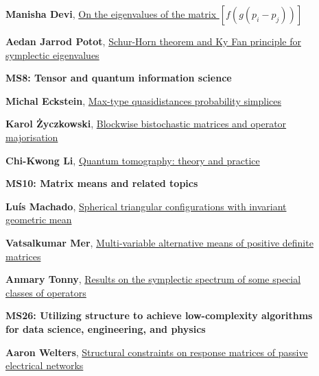 \documentclass[ILAS2025-program.tex]{subfiles}
\begin{document}
\begin{description}
\begin{description}
        \item[] \hypertarget{up0047}{}\textbf{Manisha Devi}, \hyperlink{down0047}{On the eigenvalues of the matrix $[f(g(p_i-p_j))]$}
        \item[] \hypertarget{up0048}{}\textbf{Aedan Jarrod Potot}, \hyperlink{down0048}{Schur-Horn theorem and Ky Fan principle for symplectic eigenvalues}
        \end{description}
    \begin{description}
    \item[] {\color{mstitle}\textbf{MS8: Tensor and quantum information science}} 
    \item[] \hypertarget{up0052}{}\textbf{Michal Eckstein}, \hyperlink{down0052}{Max-type quasidistances probability simplices}
        \item[] \hypertarget{up0053}{}\textbf{Karol Życzkowski}, \hyperlink{down0053}{Blockwise bistochastic matrices and operator majorisation}
        \item[] \hypertarget{up0054}{}\textbf{Chi-Kwong Li}, \hyperlink{down0054}{Quantum tomography: theory and practice
}
        \end{description}
    \begin{description}
    \item[] {\color{mstitle}\textbf{MS10: Matrix means and related topics}} 
    \item[] \hypertarget{up0055}{}\textbf{Luís Machado}, \hyperlink{down0055}{Spherical triangular configurations with invariant geometric mean}
        \item[] \hypertarget{up0056}{}\textbf{Vatsalkumar Mer}, \hyperlink{down0056}{Multi-variable alternative means of positive definite matrices}
        \item[] \hypertarget{up0057}{}\textbf{Anmary Tonny}, \hyperlink{down0057}{Results on the symplectic spectrum of some special classes of operators}
        \end{description}
    \begin{description}
    \item[] {\color{mstitle}\textbf{MS26: Utilizing structure to achieve low-complexity algorithms for data science, engineering, and physics}} 
    \item[] \hypertarget{up0058}{}\textbf{Aaron Welters}, \hyperlink{down0058}{Structural constraints on response matrices of passive electrical networks
}
\end{description}
\end{description}
\end{document}
